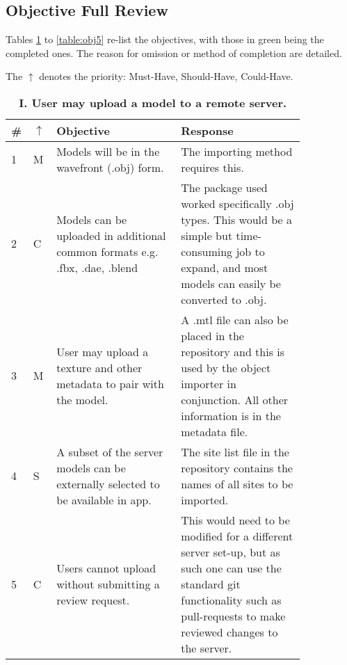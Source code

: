 \documentclass[12pt, a4paper]{article}
\newcommand{\done}[1]{\textcolor{brycedoesntlikegrey}{#1}}
\begin{document}
\subsection{Objective Full Review}
Tables \ref{table:obj1} to \ref{table:obj5} re-list the objectives, with those in \done{green} being the completed ones. The reason for omission or method of completion are detailed.

The $\uparrow$ denotes the priority: Must-Have, Should-Have, Could-Have.

\begin{table}[H]
\caption{\textbf{I. User may upload a model to a remote server.}}

\begin{tabular}{| p{0.02\linewidth} | p{0.02\linewidth} | p{0.4\linewidth} | p{0.4\linewidth} | }
\hline
\textbf{\#} & \textbf{$\uparrow$} & \textbf{Objective} & \textbf{Response}
\\ \hline
1 & M & \done{Models will be in the wavefront (.obj) form. } & The importing method requires this. \\ \hline
2 & C & Models can be uploaded in additional common formats e.g. .fbx, .dae, .blend & The package used worked specifically .obj types. This would be a simple but time-consuming job to expand, and most models can easily be converted to .obj. \\ \hline
3 & M & \done{User may upload a texture and other metadata to pair with the model.} & A .mtl file can also be placed in the repository and this is used by the object importer in conjunction. All other information is in the metadata file. \\ \hline
4 & S & \done{A subset of the server models can be externally selected to be available in app.} & The site list file in the repository contains the names of all sites to be imported. \\ \hline
5 & C & \done{Users cannot upload without submitting a review request.} & This would need to be modified for a different server set-up, but as such one can use the standard git functionality such as pull-requests to make reviewed changes to the server. \\ \hline
\end{tabular}
\label{table:obj1}
\end{table}
\end{document}
